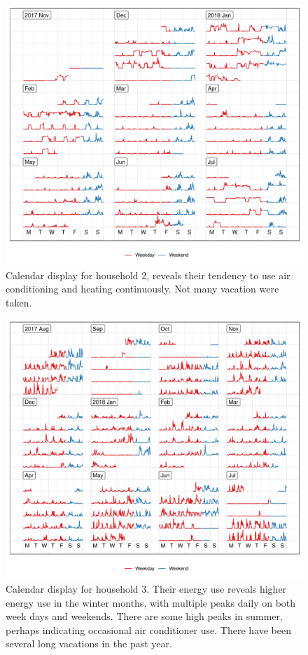 \documentclass[12pt]{article}
\begin{document}
\begin{figure}

{\centering \includegraphics[width=\textwidth]{figure/h2-1} 

}

\caption{Calendar display for household 2, reveals their tendency to use air conditioning and heating continuously. Not many vacation were taken.}\label{fig:h2}
\end{figure}

\begin{figure}

{\centering \includegraphics[width=\textwidth]{figure/h3-1} 

}

\caption{Calendar display for household 3. Their energy use reveals higher energy use in the winter months, with multiple peaks daily on both week days and weekends. There are some high peaks in summer, perhaps indicating occasional air conditioner use. There have been several long vacations in the past year.}\label{fig:h3}
\end{figure}
\end{document}
